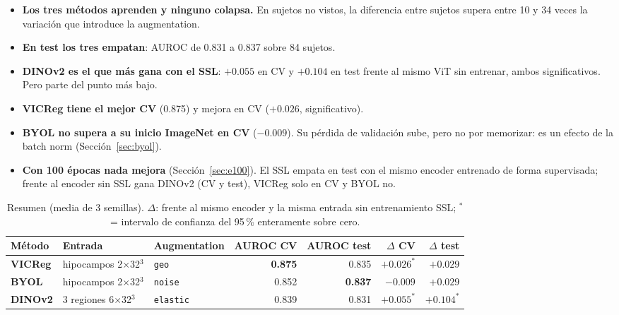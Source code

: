 \documentclass[11pt,a4paper]{article}
\begin{document}
\begin{tldrbox}
\begin{itemize}[leftmargin=12pt]
\item \textbf{Los tres métodos aprenden y ninguno colapsa.} En sujetos no vistos, la
  diferencia entre sujetos supera entre 10 y 34 veces la variación que introduce la
  augmentation.
\item \textbf{En test los tres empatan}: AUROC de 0.831 a 0.837 sobre 84 sujetos.
\item \textbf{DINOv2 es el que más gana con el SSL}: $+0.055$ en CV y $+0.104$ en test
  frente al mismo ViT sin entrenar, ambos significativos. Pero parte del punto más bajo.
\item \textbf{VICReg tiene el mejor CV} (0.875) y mejora en CV ($+0.026$, significativo).
\item \textbf{BYOL no supera a su inicio ImageNet en CV} ($-0.009$). Su pérdida de
  validación sube, pero no por memorizar: es un efecto de la batch norm (Sección~\ref{sec:byol}).
\item \textbf{Con 100 épocas nada mejora} (Sección~\ref{sec:e100}). El SSL empata en test con el
  mismo encoder entrenado de forma supervisada; frente al encoder sin SSL gana DINOv2 (CV y
  test), VICReg solo en CV y BYOL no.
\end{itemize}
\end{tldrbox}

\begin{table}[H]
\centering
\small
\begin{tabular}{lllrrrr}
\toprule
Método & Entrada & Augmentation & AUROC CV & AUROC test & $\Delta$ CV & $\Delta$ test \\
\midrule
\textcolor{vicregc}{\textbf{VICReg}} & hipocampos 2$\times$32$^3$ & \texttt{geo} & \textbf{0.875} & 0.835 & $+0.026^{*}$ & $+0.029$ \\
\textcolor{byolc}{\textbf{BYOL}} & hipocampos 2$\times$32$^3$ & \texttt{noise} & 0.852 & \textbf{0.837} & $-0.009$ & $+0.029$ \\
\textcolor{dinoc}{\textbf{DINOv2}} & 3 regiones 6$\times$32$^3$ & \texttt{elastic} & 0.839 & 0.831 & $+0.055^{*}$ & $+0.104^{*}$ \\
\bottomrule
\end{tabular}
\caption{Resumen (media de 3 semillas). $\Delta$: frente al mismo encoder y la misma entrada
sin entrenamiento SSL; $^{*}$ = intervalo de confianza del 95\,\% enteramente sobre cero.}
\label{tab:summary}
\end{table}
\end{document}
